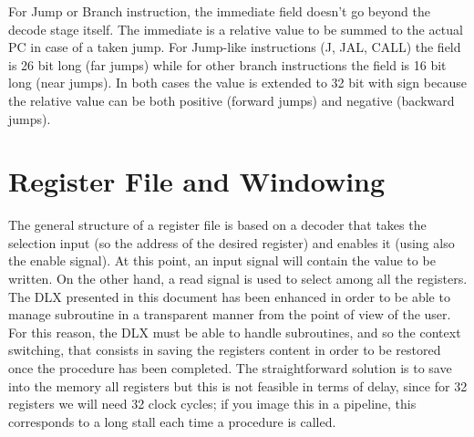For Jump or Branch instruction, the immediate field doesn't go beyond the decode stage itself. The immediate is a relative value to be summed to the actual PC in case of a taken jump. For Jump-like instructions (J, JAL, CALL) the field is 26 bit long (far jumps) while for other branch instructions the field is 16 bit long (near jumps). In both cases the value is extended to 32 bit with sign because the relative value can be both positive (forward jumps) and negative (backward jumps).

\section{Register File and Windowing}
The general structure of a register file is based on a decoder that takes the selection input (so the address of the desired register) and enables it (using also the enable signal). At this point, an input signal will contain the value to be written. On the other hand, a read signal is used to select among all the registers.\newline\newline
The DLX presented in this document has been enhanced in order to be able to manage subroutine in a transparent manner from the point of view of the user. For this reason, the DLX must be able to handle subroutines, and so the context switching, that consists in saving the
registers content in order to be restored once the procedure has been completed. The straightforward solution is to save into the memory all registers but this is not feasible in terms of delay, since for 32 registers we will need 32 clock cycles; if you image this in a pipeline, this corresponds to a long stall each time a procedure is called.

